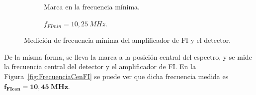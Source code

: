     \begin{figure}[H]
      \centering
      \begin{subfigure}[ht]{0.48\textwidth}
        \caption{Marca en la frecuencia mínima.}
        \label{fig:FrecuenciaMinFI_Osc}
      \end{subfigure}
      \hfill 
      \begin{subfigure}[ht]{0.48\textwidth}
        \caption{$f_{FImin} = 10,25~MHz$.}
        \label{fig:FrecuneciaMinFI_Gener}
      \end{subfigure}

      \caption{Medición de frecuencia mínima del amplificador de FI y el detector.}
      \label{fig:FrecuenciaMinFI}
    \end{figure}

    De la misma forma, se lleva la marca a la posición central del espectro, y se mide la frecuencia central 
    del detector y el amplificador de FI. En la Figura~\ref{fig:FrecuenciaCenFI} se puede ver que dicha 
    frecuencia medida es $\mathbf{f_{FIcen} = 10,45~MHz}$.

